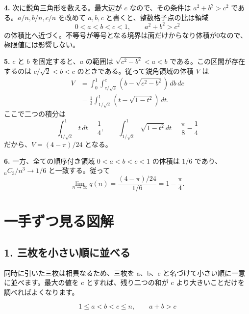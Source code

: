 \documentclass[uplatex,dvipdfmx,11pt]{jsarticle}
\begin{document}
\textbf{4.} 次に鋭角三角形を数える。最大辺が \(c\) なので、その条件は \(a^2+b^2>c^2\) である。\(a/n,b/n,c/n\) を改めて \(a,b,c\) と書くと、整数格子点の比は領域 \[0<a<b<c<1,\qquad a^2+b^2>c^2\] の体積比へ近づく。不等号が等号となる境界は面だけからなり体積が0なので、極限値には影響しない。

\textbf{5.} \(c\) と \(b\) を固定すると、\(a\) の範囲は \(\sqrt{c^2-b^2}<a<b\) である。この区間が存在するのは \(c/\sqrt2<b<c\) のときである。従って鋭角領域の体積 \(V\) は \[\begin{aligned}V&=\int_0^1\int_{c/\sqrt2}^{c}\left(b-\sqrt{c^2-b^2}\right)\,db\,dc\\&=\frac13\int_{1/\sqrt2}^{1}\left(t-\sqrt{1-t^2}\right)\,dt.\end{aligned}\] ここで二つの積分は \[\int_{1/\sqrt2}^{1}t\,dt=\frac14,\qquad \int_{1/\sqrt2}^{1}\sqrt{1-t^2}\,dt=\frac\pi8-\frac14\] だから、\(V=(4-\pi)/24\) となる。

\textbf{6.} 一方、全ての順序付き領域 \(0<a<b<c<1\) の体積は \(1/6\) であり、\({}_{n}C_3/n^3\to1/6\) と一致する。従って \[\lim_{n\to\infty}q(n)=\frac{(4-\pi)/24}{1/6}=1-\frac\pi4.\]

\clearpage

\section*{一手ずつ見る図解}

\subsection*{1. 三枚を小さい順に並べる}

同時に引いた三枚は相異なるため、三枚を a、b、c と名づけて小さい順に一意に並べます。最大の値を c とすれば、残り二つの和が c より大きいことだけを調べればよくなります。

\[
1\le a<b<c\le n,\qquad a+b>c
\]

\begin{center}


\end{center}
\end{document}
